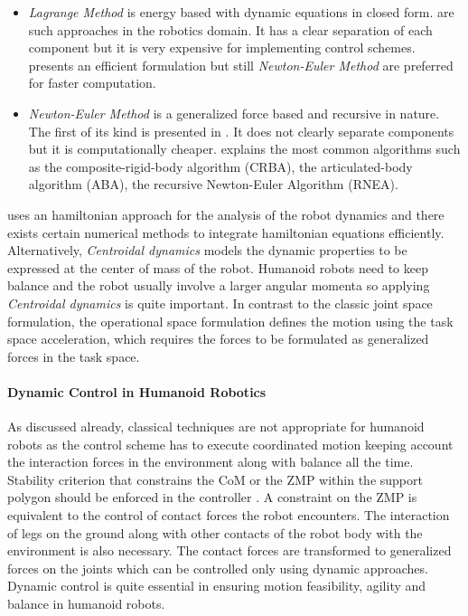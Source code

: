 \begin{itemize}
    \item \textit{Lagrange Method} is energy based with dynamic equations in closed form. \cite{uicker1969dynamic,kahn1969near,bejczy1974robot} are such approaches in the robotics domain. It has a clear separation of each component but it is very expensive  for implementing control schemes. \cite{hollerbach1980recursive} presents an efficient formulation but still \textit{Newton-Euler Method} are preferred for faster computation.
    \item \textit{Newton-Euler Method} is a generalized force based and recursive in nature. The first of its kind is presented in \cite{orin1979kinematic}. It does not clearly separate components but it is computationally cheaper. \cite{Featherstone2009} explains the most common algorithms such as the composite-rigid-body algorithm (CRBA), the articulated-body algorithm (ABA), the recursive Newton-Euler Algorithm (RNEA). 
\end{itemize}
\cite{spong1992remarks} uses an hamiltonian approach for the analysis of the robot dynamics and there exists certain numerical methods to integrate hamiltonian equations efficiently. Alternatively, \textit{Centroidal dynamics} \cite{orin2013centroidal,orin2008centroidal} models the dynamic properties to be expressed at the center of mass of the robot. Humanoid robots need to keep balance and the robot usually involve a larger angular momenta so applying \textit{Centroidal dynamics} is quite important.
In contrast to the classic joint space formulation, the operational space formulation \cite{Khatib1987} defines the motion using the task space acceleration, which requires the forces to be formulated as generalized forces in the task space.

\paragraph{Dynamic Control in Humanoid Robotics}
As discussed already, classical techniques are not appropriate for humanoid robots as the control scheme has to execute coordinated motion keeping account the interaction forces in the environment along with balance all the time. Stability criterion that constrains the CoM or the ZMP within the support polygon should be enforced in the controller \cite{wieber2002stability}. A constraint on the ZMP is equivalent to the control of contact forces the robot encounters. The interaction of legs on the ground along with other contacts of the robot body with the environment is also necessary. The contact forces are transformed to generalized forces on the joints which can be controlled only using dynamic approaches. Dynamic control is quite essential in ensuring motion feasibility, agility and balance in 
humanoid robots.

